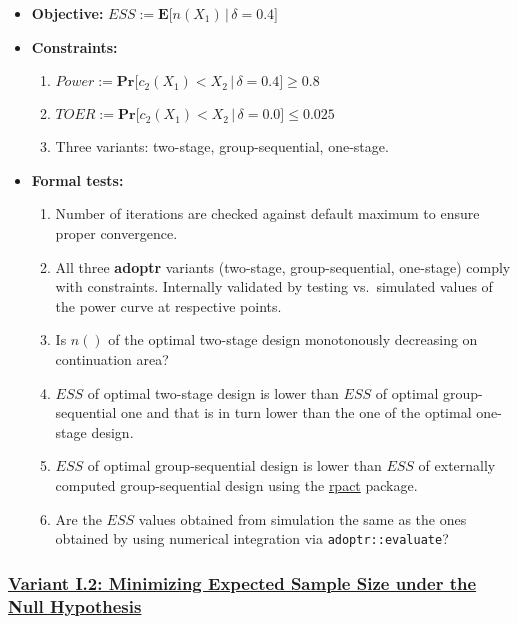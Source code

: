 \documentclass[]{book}
\providecommand{\tightlist}{%
  \setlength{\itemsep}{0pt}\setlength{\parskip}{0pt}}
\begin{document}
\begin{itemize}
\tightlist
\item
  \textbf{Objective:} \(ESS := \boldsymbol{E}\big[n(X_1)\,|\,\delta=0.4\big]\)
\item
  \textbf{Constraints:}

  \begin{enumerate}
  \def\labelenumi{\arabic{enumi}.}
  \tightlist
  \item
    \(Power := \boldsymbol{Pr}\big[c_2(X_1) < X_2\,|\,\delta=0.4\big] \geq 0.8\)
  \item
    \(TOER := \boldsymbol{Pr}\big[c_2(X_1) < X_2\,|\,\delta=0.0\big] \leq 0.025\)
  \item
    Three variants: two-stage, group-sequential, one-stage.
  \end{enumerate}
\item
  \textbf{Formal tests:}

  \begin{enumerate}
  \def\labelenumi{\arabic{enumi}.}
  \tightlist
  \item
    Number of iterations are checked against default maximum to ensure proper
    convergence.
  \item
    All three \textbf{adoptr} variants (two-stage, group-sequential, one-stage)
    comply with constraints. Internally validated by testing vs.~simulated
    values of the power curve at respective points.
  \item
    Is \(n()\) of the optimal two-stage design monotonously decreasing on
    continuation area?
  \item
    \(ESS\) of optimal two-stage design is lower than \(ESS\) of optimal
    group-sequential one and that is in turn lower than the one of the
    optimal one-stage design.
  \item
    \(ESS\) of optimal group-sequential design is lower than \(ESS\) of
    externally computed group-sequential design using the \href{https://rpact.org/}{rpact} package.
  \item
    Are the \(ESS\) values obtained from simulation the same as the ones
    obtained by using numerical integration via \texttt{adoptr::evaluate}?
  \end{enumerate}
\end{itemize}

\hypertarget{variant-i.2-minimizing-expected-sample-size-under-the-null-hypothesis}{%
\subsubsection{\texorpdfstring{\protect\hyperlink{variantI_2}{Variant I.2: Minimizing Expected Sample Size under the Null Hypothesis}}{Variant I.2: Minimizing Expected Sample Size under the Null Hypothesis}}\label{variant-i.2-minimizing-expected-sample-size-under-the-null-hypothesis}}
\end{document}
